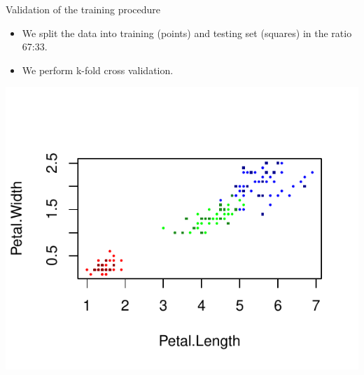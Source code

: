 \documentclass[aspectratio=1610, t]{beamer}\usepackage[]{graphicx}\usepackage[]{color}
\makeatletter
\def\maxwidth{ %
  \ifdim\Gin@nat@width>\linewidth
    \linewidth
  \else
    \Gin@nat@width
  \fi
}
\newenvironment{knitrout}{}{} %
\makeatother
\begin{document}
\begin{frame}[t]{Validation of the training procedure} \small
  \begin{itemize}
    \item We split the data into training (points) and testing set (squares) in the ratio 67:33.
    \item We perform k-fold cross validation.
   \end{itemize}

   \vspace{-1.8cm}
   





\begin{knitrout}
\color{fgcolor}

{\centering \includegraphics[width=\maxwidth]{figure/plot-1} 

}


\end{knitrout}

\end{frame}
\end{document}
